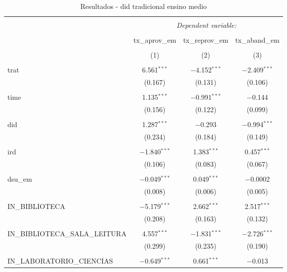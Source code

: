 
\begin{table}[!htbp] \centering 
  \caption{Resultados - did tradicional ensino medio} 
  \label{} 
\begin{tabular}{@{\extracolsep{5pt}}lccc} 
\\[-1.8ex]\hline 
\hline \\[-1.8ex] 
 & \multicolumn{3}{c}{\textit{Dependent variable:}} \\ 
\cline{2-4} 
\\[-1.8ex] & tx\_aprov\_em & tx\_reprov\_em & tx\_aband\_em \\ 
\\[-1.8ex] & (1) & (2) & (3)\\ 
\hline \\[-1.8ex] 
 trat & 6.561$^{***}$ & $-$4.152$^{***}$ & $-$2.409$^{***}$ \\ 
  & (0.167) & (0.131) & (0.106) \\ 
  & & & \\ 
 time & 1.135$^{***}$ & $-$0.991$^{***}$ & $-$0.144 \\ 
  & (0.156) & (0.122) & (0.099) \\ 
  & & & \\ 
 did & 1.287$^{***}$ & $-$0.293 & $-$0.994$^{***}$ \\ 
  & (0.234) & (0.184) & (0.149) \\ 
  & & & \\ 
 ird & $-$1.840$^{***}$ & 1.383$^{***}$ & 0.457$^{***}$ \\ 
  & (0.106) & (0.083) & (0.067) \\ 
  & & & \\ 
 dsu\_em & $-$0.049$^{***}$ & 0.049$^{***}$ & $-$0.0002 \\ 
  & (0.008) & (0.006) & (0.005) \\ 
  & & & \\ 
 IN\_BIBLIOTECA & $-$5.179$^{***}$ & 2.662$^{***}$ & 2.517$^{***}$ \\ 
  & (0.208) & (0.163) & (0.132) \\ 
  & & & \\ 
 IN\_BIBLIOTECA\_SALA\_LEITURA & 4.557$^{***}$ & $-$1.831$^{***}$ & $-$2.726$^{***}$ \\ 
  & (0.299) & (0.235) & (0.190) \\ 
  & & & \\ 
 IN\_LABORATORIO\_CIENCIAS & $-$0.649$^{***}$ & 0.661$^{***}$ & $-$0.013 \\ 

\end{tabular}
\end{table}
